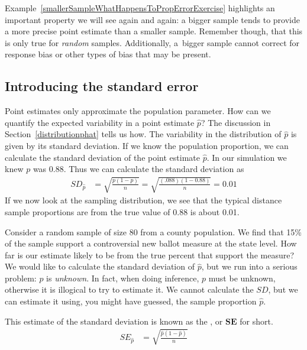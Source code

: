Example~\ref{smallerSampleWhatHappensToPropErrorExercise}
highlights an important property we will see again and again:
a bigger sample tends to provide a more precise point estimate
than a smaller sample.
Remember though, that this is only true for \emph{random} samples.
Additionally, a~bigger sample cannot correct for response bias or other types of bias that may be present.


\D{\newpage}

\subsection{Introducing the standard error}

Point estimates only approximate the population parameter.  How can we quantify the expected variability in a point estimate $\hat{p}$? The discussion in Section~\ref{distributionphat} tells us how. The variability in the distribution of $\hat{p}$ is given by its standard deviation. If we know the population proportion, we can calculate the standard deviation of the point estimate $\hat{p}$.  In our simulation we knew $p$ was 0.88.  Thus we can calculate the standard deviation as 
\begin{align*}
SD_{\hat{p}}&=\sqrt{\frac{p(1-p)}{n}} = \sqrt{\frac{(.088)(1-0.88)}{n}}= 0.01
\end{align*}
If we now look at the sampling distribution, we see that the typical distance sample proportions are from the true value of 0.88 is about 0.01.

\begin{examplewrap}
\begin{nexample}{Consider a random sample of size 80 from a county population.
    We find that 15\% of the sample support a controversial new ballot measure
    at the state level.
    How far is our estimate likely to be from the true percent that support
    the measure?}
We would like to calculate the standard deviation of $\hat{p}$,
but we run into a serious problem: $p$ is \emph{unknown}.
In fact, when doing inference, $p$ must be unknown, otherwise it is illogical
to try to estimate it.
We cannot calculate the $SD$, but we can estimate it using, you might have
guessed, the sample proportion $\hat{p}$.
\end{nexample}
\end{examplewrap}
 
This estimate of the standard deviation is known as the , or $\pmb{SE}$ for short.
\begin{align*}
SE_{\hat{p}}&=\sqrt{\frac{\hat{p}(1-\hat{p})}{n}}
\end{align*}

